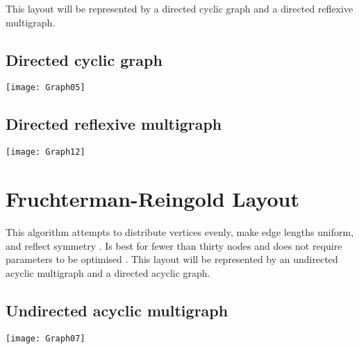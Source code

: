 \documentclass[10pt,a4paper,openany]{article}
\begin{document}
	This layout will be represented by a directed cyclic graph and a directed reflexive multigraph.
	
		\subsection*{Directed cyclic graph}
		
		
	
		\begin{center}
			\texttt{[image: Graph05]}
		\end{center}
	
	\newpage
	
		\subsection*{Directed reflexive multigraph}
		
		
		
		\begin{center}
			\texttt{[image: Graph12]}
		\end{center}
	
\newpage
	
	\section*{Fruchterman-Reingold Layout}
	This algorithm attempts to distribute vertices evenly, make edge lengths uniform, and reflect symmetry \citep{fruchterman1991graph}. Is best for fewer than thirty
	nodes and does not require parameters to be optimised \citep{gibson2013survey}.
	This layout will be represented by an undirected acyclic multigraph and a directed acyclic graph.
	
		\subsection*{Undirected acyclic multigraph}
	
		
	
		\begin{center}
			\texttt{[image: Graph07]}
		\end{center}
	
\end{document}
